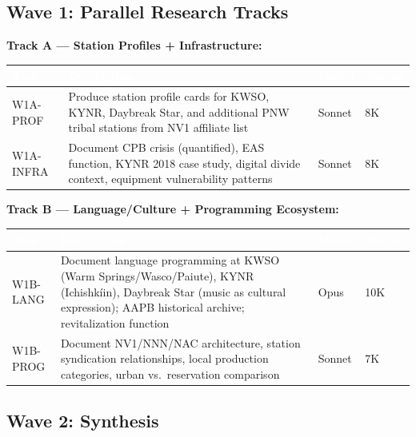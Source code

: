 \documentclass[11pt,letterpaper]{article}
\newcommand{\tableheader}[1]{\textbf{\sffamily\textcolor{white}{#1}}}
\begin{document}
\subsection{Wave 1: Parallel Research Tracks}

\textbf{Track A --- Station Profiles + Infrastructure:}

\begin{center}
\begin{tabularx}{\textwidth}{L{3cm}XC{1.8cm}C{1.8cm}}
\toprule
{}
\tableheader{Task} & \tableheader{Description} & \tableheader{Model} & \tableheader{Tokens} \\
\midrule
W1A-PROF & Produce station profile cards for KWSO, KYNR, Daybreak Star, and additional PNW tribal stations from NV1 affiliate list & Sonnet & 8K \\
W1A-INFRA & Document CPB crisis (quantified), EAS function, KYNR 2018 case study, digital divide context, equipment vulnerability patterns & Sonnet & 8K \\
\bottomrule
\end{tabularx}
\end{center}

\textbf{Track B --- Language/Culture + Programming Ecosystem:}

\begin{center}
\begin{tabularx}{\textwidth}{L{3cm}XC{1.8cm}C{1.8cm}}
\toprule
{}
\tableheader{Task} & \tableheader{Description} & \tableheader{Model} & \tableheader{Tokens} \\
\midrule
W1B-LANG & Document language programming at KWSO (Warm Springs/Wasco/Paiute), KYNR (Ichishkíin), Daybreak Star (music as cultural expression); AAPB historical archive; revitalization function & Opus & 10K \\
W1B-PROG & Document NV1/NNN/NAC architecture, station syndication relationships, local production categories, urban vs.\ reservation comparison & Sonnet & 7K \\
\bottomrule
\end{tabularx}
\end{center}

\subsection{Wave 2: Synthesis}
\end{document}
